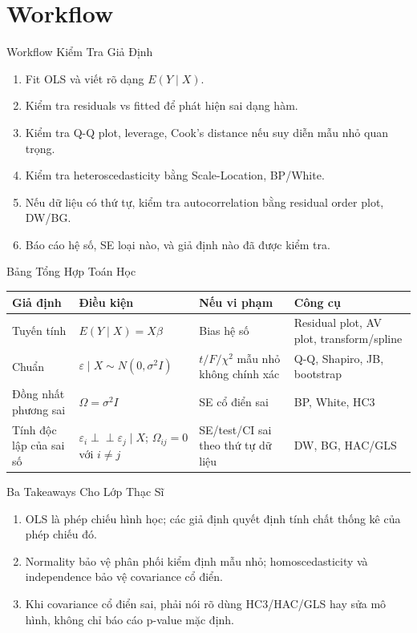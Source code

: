\documentclass[aspectratio=169,professionalfonts]{beamer}
\begin{document}
\section{Workflow}
\begin{frame}{Workflow Kiểm Tra Giả Định}
  \small
  \begin{enumerate}
    \item Fit OLS và viết rõ dạng $E(Y\mid X)$.
    \item Kiểm tra residuals vs fitted để phát hiện sai dạng hàm.
    \item Kiểm tra Q-Q plot, leverage, Cook's distance nếu suy diễn mẫu nhỏ quan trọng.
    \item Kiểm tra heteroscedasticity bằng Scale-Location, BP/White.
    \item Nếu dữ liệu có thứ tự, kiểm tra autocorrelation bằng residual order plot, DW/BG.
    \item Báo cáo hệ số, SE loại nào, và giả định nào đã được kiểm tra.
  \end{enumerate}
\end{frame}

\begin{frame}{Bảng Tổng Hợp Toán Học}
  \scriptsize
  \begin{tabularx}{\textwidth}{@{}l>{\raggedright\arraybackslash}X>{\raggedright\arraybackslash}X>{\raggedright\arraybackslash}X@{}}
    \toprule
    Giả định & Điều kiện & Nếu vi phạm & Công cụ \\
    \midrule
    Tuyến tính & $E(Y\mid X)=X\beta$ & Bias hệ số & Residual plot, AV plot, transform/spline \\
    Chuẩn & $\varepsilon\mid X\sim N(0,\sigma^2I)$ & $t/F/\chi^2$ mẫu nhỏ không chính xác & Q-Q, Shapiro, JB, bootstrap \\
    Đồng nhất phương sai & $\Omega=\sigma^2I$ & SE cổ điển sai & BP, White, HC3 \\
    Tính độc lập của sai số & $\varepsilon_i\perp\!\!\!\perp\varepsilon_j\mid X$; $\Omega_{ij}=0$ với $i\neq j$ & SE/test/CI sai theo thứ tự dữ liệu & DW, BG, HAC/GLS \\
    \bottomrule
  \end{tabularx}
\end{frame}

\begin{frame}{Ba Takeaways Cho Lớp Thạc Sĩ}
  \large
  \begin{enumerate}
    \item OLS là phép chiếu hình học; các giả định quyết định tính chất thống kê của phép chiếu đó.
    \item Normality bảo vệ phân phối kiểm định mẫu nhỏ; homoscedasticity và independence bảo vệ covariance cổ điển.
    \item Khi covariance cổ điển sai, phải nói rõ dùng HC3/HAC/GLS hay sửa mô hình, không chỉ báo cáo p-value mặc định.
  \end{enumerate}
\end{frame}
\end{document}

